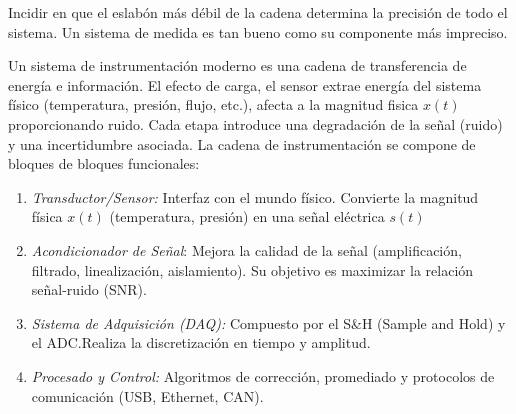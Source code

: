 \begin{marginfigure}
    \centering
    \shorthandoff{>}
    \caption[Cadena de Instrumentación.]{Cadena de Instrumentación: flujo desde la magnitud física hasta la presentación de datos, destacando las etapas de acondicionamiento y digitalización.}\label{fig:cadena_instrumentacion}
\end{marginfigure}

Incidir en que el eslabón más débil de la cadena determina la precisión de todo el sistema. Un sistema de medida es tan bueno como su componente más impreciso.

Un sistema de instrumentación moderno es una cadena de transferencia de energía e información. El efecto de carga, el sensor extrae energía del sistema físico (temperatura, presión, flujo, etc.), afecta a la magnitud fisica $x(t)$ proporcionando ruido.  Cada etapa introduce una degradación de la señal (ruido) y una incertidumbre asociada. La cadena de instrumentación se compone de bloques de bloques funcionales:
\begin{enumerate}
    \item \emph{Transductor/Sensor:} Interfaz con el mundo físico. Convierte la magnitud física $x(t)$ (temperatura, presión) en una señal eléctrica $s(t)$
    \item \emph{Acondicionador de Señal}: Mejora la calidad de la señal (amplificación, filtrado, linealización, aislamiento). Su objetivo es maximizar la relación señal-ruido (SNR).
    \item \emph{Sistema de Adquisición (DAQ):} Compuesto por el S\&H (Sample and Hold) y el ADC.\@ Realiza la discretización en tiempo y amplitud.
    \item \emph{Procesado y Control:} Algoritmos de corrección, promediado y protocolos de comunicación (USB, Ethernet, CAN).
\end{enumerate}

